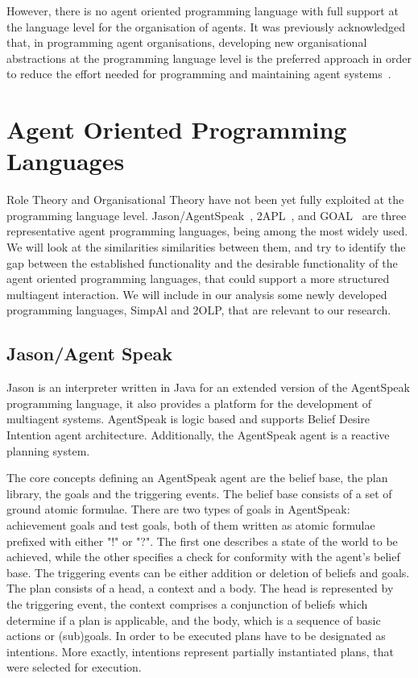 \documentclass[a4paper,12pt,oneside,fleqn]{book} %
\begin{document}
However, there is no agent oriented programming language with full support
at the language level for the organisation of agents. It was previously
acknowledged that, in programming agent organisations, developing new
organisational abstractions at the programming language level is the
preferred approach in order to reduce the effort needed for programming and
maintaining agent systems~\cite{DBLP:conf/esaw/RiemsdijkHJ09}.

\section{Agent Oriented Programming Languages} %
Role Theory and Organisational Theory have not been yet fully exploited at
the programming language level.
Jason/AgentSpeak~\cite{DBLP:books/sp/map2005/BordiniHV05},
2APL~\cite{DBLP:journals/aamas/Dastani08}, and
GOAL~\cite{DBLP:journals/corr/cs-AI-0207008} are three representative agent
programming languages, being among the most widely used. We will look at
the similarities similarities between them, and try to identify the gap
between the established functionality and the desirable functionality of
the agent oriented programming languages, that could support a more
structured multiagent interaction. We will include in our analysis some
newly developed programming languages, SimpAl and 2OLP, that are relevant
to our research.

\subsection{Jason/Agent Speak} %
Jason is an interpreter written in Java for an extended version of the
AgentSpeak programming language, it also provides a platform for the
development of multiagent systems. AgentSpeak is logic based and supports
Belief Desire Intention agent architecture. Additionally, the AgentSpeak
agent is a reactive planning system.

The core concepts defining an AgentSpeak agent are the belief base, the
plan library, the goals and the triggering events. The belief base consists
of a set of ground atomic formulae. There are two types of goals in
AgentSpeak: achievement goals and test goals, both of them written as
atomic formulae prefixed with either "!" or "?". The first one describes a
state of the world to be achieved, while the other specifies a check for
conformity with the agent's belief base. The triggering events can be
either addition or deletion of beliefs and goals. The plan consists of a
head, a context and a body. The head is represented by the triggering
event, the context comprises a conjunction of beliefs which determine if a
plan is applicable, and the body, which is a sequence of basic actions or
(sub)goals. In order to be executed plans have to be designated as
intentions. More exactly, intentions represent partially instantiated
plans, that were selected for execution.
\end{document}

